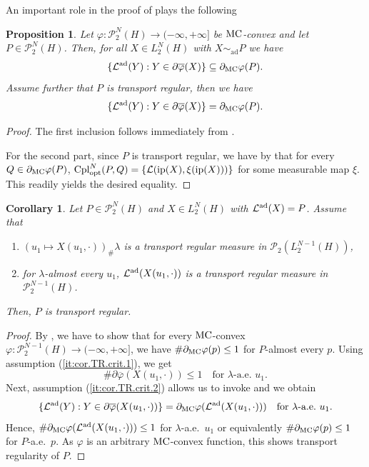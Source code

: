 \documentclass[a4paper]{amsart}
\numberwithin{theorem}{section}
\newtheorem{proposition}[theorem]{Proposition}
\newtheorem{corollary}[theorem]{Corollary}
\theoremstyle{definition}
\newcommand{\law}{\mathcal{L}}
\newcommand{\cpl}{\textup{Cpl}}
\newcommand{\Pc}{\mathcal P}
\newcommand{\cplopt}{\cpl_{\rm opt}}
\newcommand{\simad}{\sim_{\mathrm{ad}}}
\renewcommand{\H}{H}
\renewcommand{\phi}{\varphi}
\newcommand{\mc}{\textup{MC}}
\newcommand{\ip}{\textup{ip}}
\newcommand{\lawad}{\law^{\textup{ad}}}
\begin{document}
An important role in the proof of  plays the following

\begin{proposition}\label{cor:LawInvSubDiffRandom.adapted}
Let $\phi: \Pc_2^N(\H) \to (-\infty, +\infty]$ be $\mc$-convex and let $P\in \Pc_2^N(\H)$. Then, for all $X \in L_2^N(\H)$ with $X\simad P$ we have 
\[
    \{ \lawad(Y) : Y\in \partial \overline\phi(X) \} \subseteq \partial_\mc \phi (P).
\]
Assume further that $P$ is transport regular, then we have
\[
    \{ \lawad(Y) : Y\in \partial \overline\phi(X) \} = \partial_\mc \phi (P).
\]
\end{proposition}

\begin{proof}
The first inclusion  follows immediately from .

For the second part, since $P$ is transport regular, we have by  that for every $Q\in\partial_\mc \phi(P)$, $\cplopt^N(P,Q)=\{\law(\ip(X),\xi(\ip(X)))\}$ for some measurable map $\xi$. This readily yields the desired equality.
\end{proof}

\begin{corollary} \label{cor:TR.crit}
    Let $P \in \Pc_2^N(\H)$ and $X \in L_2^N(\H)$ with $\lawad(X) = P$. Assume that
    \begin{enumerate}
        \item \label{it:cor.TR.crit.1} $(u_1 \mapsto X(u_1,\cdot))_\# \lambda$ is a transport regular measure in $\Pc_2(L_2^{N-1}(\H))$,
        \item \label{it:cor.TR.crit.2}for $\lambda$-almost every $u_1$, $\lawad(X(u_1,\cdot))$ is a transport regular measure in $\Pc_2^{N-1}(\H)$.
    \end{enumerate}
    Then, $P$ is transport regular.
\end{corollary}

\begin{proof} 
    By , we have to show that for every $\mc$-convex $\phi : \Pc_2^{N-1}(\H) \to (-\infty,+\infty]$, we have $\# \partial_\mc \phi(p) \le 1$ for $P$-almost every $p$.
    Using assumption (\ref{it:cor.TR.crit.1}), we get 
    \[
        \# \partial \overline{\phi}(X(u_1,\cdot)) \le 1 \quad \text{for $\lambda$-a.e.\ $u_1$.}
    \]
    Next, assumption (\ref{it:cor.TR.crit.2}) allows us to invoke  and we obtain
    \[
        \{ \lawad(Y) : Y \in \partial \overline{\phi}(X(u_1,\cdot)) \} = \partial_\mc \phi(\lawad(X(u_1,\cdot))) \quad \text{for $\lambda$-a.e.\ $u_1$.}
    \]
    Hence, $\# \partial_\mc \phi(\lawad(X(u_1,\cdot))) \le 1$ for $\lambda$-a.e.\ $u_1$ or equivalently $\# \partial_\mc \phi(p) \le 1$ for $P$-a.e.\ $p$.
    As $\phi$ is an arbitrary $\mc$-convex function, this shows transport regularity of $P$.
\end{proof}
\end{document}

